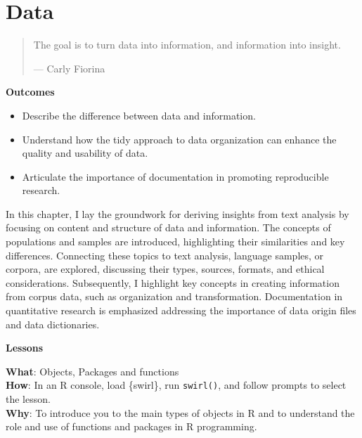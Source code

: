 \documentclass[
  letterpaper,
]{latex/krantz}
\providecommand{\tightlist}{%
  \setlength{\itemsep}{0pt}\setlength{\parskip}{0pt}}\usepackage{longtable,booktabs,array}
\theoremstyle{definition}
\theoremstyle{remark}
\begin{document}
\chapter{Data}\label{sec-data-chapter}

\begin{quote}
The goal is to turn data into information, and information into insight.

--- Carly Fiorina
\end{quote}

\begin{tcolorbox}[enhanced jigsaw, bottomrule=.15mm, leftrule=.75mm, toprule=.15mm, breakable, colframe=quarto-callout-color-frame, arc=.35mm, left=2mm, rightrule=.15mm, opacityback=0, colback=white]

\textbf{ Outcomes}

\begin{itemize}
\tightlist
\item
  Describe the difference between data and information.
\item
  Understand how the tidy approach to data organization can enhance the
  quality and usability of data.
\item
  Articulate the importance of documentation in promoting reproducible
  research.
\end{itemize}

\end{tcolorbox}

In this chapter, I lay the groundwork for deriving insights from text
analysis by focusing on content and structure of data and information.
The concepts of populations and samples are introduced, highlighting
their similarities and key differences. Connecting these topics to text
analysis, language samples, or corpora, are explored, discussing their
types, sources, formats, and ethical considerations. Subsequently, I
highlight key concepts in creating information from corpus data, such as
organization and transformation. Documentation in quantitative research
is emphasized addressing the importance of data origin files and data
dictionaries.

\begin{tcolorbox}[enhanced jigsaw, bottomrule=.15mm, leftrule=.75mm, toprule=.15mm, breakable, colframe=quarto-callout-color-frame, arc=.35mm, left=2mm, rightrule=.15mm, opacityback=0, colback=white]

\textbf{ Lessons}

\textbf{What}: Objects, Packages and functions\\
\textbf{How}: In an R console, load \{swirl\}, run \texttt{swirl()}, and
follow prompts to select the lesson.\\
\textbf{Why}: To introduce you to the main types of objects in R and to
understand the role and use of functions and packages in R programming.

\end{tcolorbox}
\end{document}
